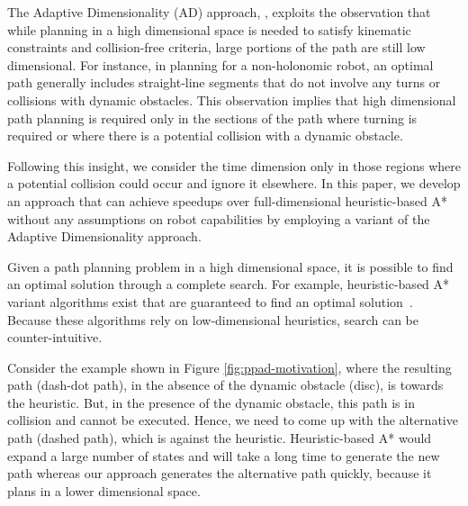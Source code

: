 The Adaptive Dimensionality (AD) approach, \cite{gochev2011path}, exploits the observation that while planning in a high dimensional space is needed to satisfy kinematic constraints and collision-free criteria, large portions of the path are still low dimensional. For instance, in planning for a non-holonomic robot, an optimal path generally includes straight-line segments that do not involve any turns or collisions with dynamic obstacles. This observation implies that high dimensional path planning is required only in the sections of the path where turning is required or where there is a potential collision with a dynamic obstacle. 

Following this insight, we consider the time dimension only in those regions where a potential collision could occur and ignore it elsewhere. In this paper, we develop an approach that can achieve speedups over full-dimensional heuristic-based A* without any assumptions on robot capabilities by employing a variant of the Adaptive Dimensionality approach.

Given a path planning problem in a high dimensional space, it is possible to find an optimal solution through a complete search. For example, heuristic-based A* variant algorithms exist that are guaranteed to find an optimal solution~\cite{silver2005cooperative}. Because these algorithms rely on low-dimensional heuristics, search can be counter-intuitive.  

Consider the example shown in Figure \ref{fig:ppad-motivation}, where the resulting path (dash-dot path), in the absence of the dynamic obstacle (disc), is towards the heuristic. But, in the presence of the dynamic obstacle, this path is in collision and cannot be executed. Hence, we need to come up with the alternative path (dashed path), which is against the heuristic. Heuristic-based A* would expand a large number of states and will take a long time to generate the new path whereas our approach generates the alternative path quickly, because it plans in a lower dimensional space.

